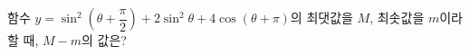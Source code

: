 함수 $y=\sin^2\left(\theta+\dfrac{\pi}{2}\right)+2\sin^2\theta+4\cos(\theta+\pi)$의 최댓값을 $M$, 최솟값을 $m$이라 할 때, $M-m$의 값은? 
